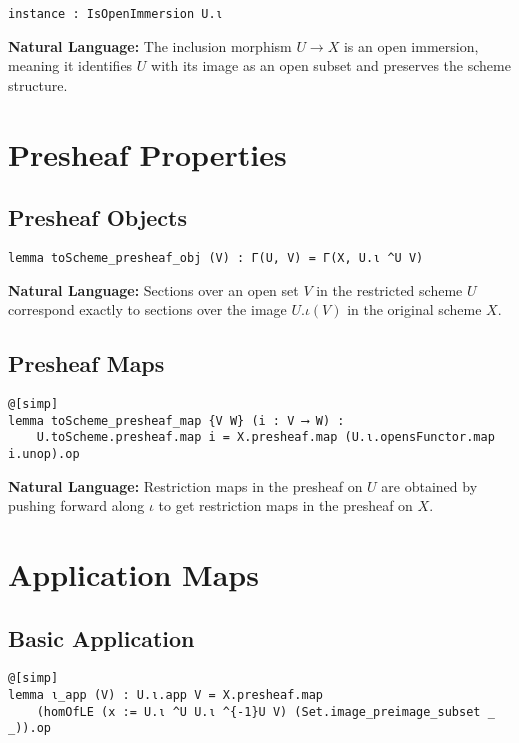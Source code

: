 \documentclass{article}
\theoremstyle{definition}
\begin{document}
\begin{lstlisting}
instance : IsOpenImmersion U.ι
\end{lstlisting}

\textbf{Natural Language:} The inclusion morphism $U \to X$ is an open immersion, meaning it identifies $U$ with its image as an open subset and preserves the scheme structure.

\section{Presheaf Properties}

\subsection{Presheaf Objects}

\begin{lstlisting}
lemma toScheme_presheaf_obj (V) : Γ(U, V) = Γ(X, U.ι ^U V)
\end{lstlisting}

\textbf{Natural Language:} Sections over an open set $V$ in the restricted scheme $U$ correspond exactly to sections over the image $U.\iota(V)$ in the original scheme $X$.

\subsection{Presheaf Maps}

\begin{lstlisting}
@[simp]
lemma toScheme_presheaf_map {V W} (i : V ⟶ W) :
    U.toScheme.presheaf.map i = X.presheaf.map (U.ι.opensFunctor.map i.unop).op
\end{lstlisting}

\textbf{Natural Language:} Restriction maps in the presheaf on $U$ are obtained by pushing forward along $\iota$ to get restriction maps in the presheaf on $X$.

\section{Application Maps}

\subsection{Basic Application}

\begin{lstlisting}
@[simp]
lemma ι_app (V) : U.ι.app V = X.presheaf.map
    (homOfLE (x := U.ι ^U U.ι ^{-1}U V) (Set.image_preimage_subset _ _)).op
\end{lstlisting}
\end{document}
